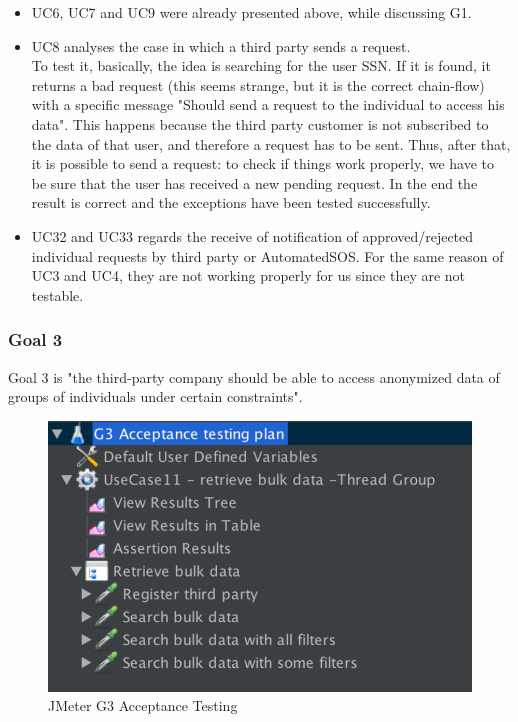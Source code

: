\begin{itemize}
\item UC6, UC7 and UC9 were already presented above, while discussing G1.

\item UC8 analyses the case in which a third party sends a request. \\
To test it, basically, the idea is searching for the user SSN. 
If it is found, it returns a bad request (this seems strange, but it is the correct chain-flow) with a specific message "Should send a
request to the individual to access his data". This happens because the third party customer is not subscribed to the data of that user, and
therefore a request has to be sent.
Thus, after that, it is possible to send a request: to check if things work properly, we have to be sure that the user has received a new pending request. In the end  the result is correct and the exceptions have been tested successfully. 

\item UC32 and UC33 regards the receive of notification of approved/rejected individual requests by third party or AutomatedSOS. For the same reason of UC3 and UC4, they are not working properly for us since they are not testable.

\end{itemize}

\subsubsection{Goal 3}
Goal 3 is "the third-party company should be able to access anonymized data of groups
of individuals under certain constraints".

\begin{figure}[H]
\includegraphics[width=0.7\linewidth]{images/goal3}
\centering
\caption{ JMeter G3 Acceptance Testing }
\label{fig:goal3}
\end{figure}

